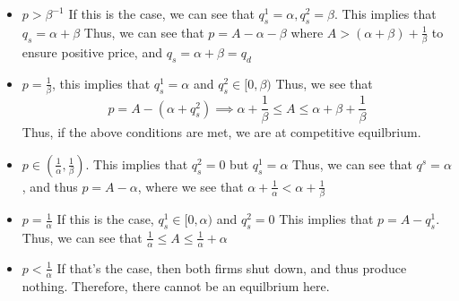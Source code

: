 \documentclass[11pt]{article}
\begin{document}
\begin{itemize}
    \item $p > \beta^{-1}$ If this is the case, we can see that $q^1_s = \alpha, q^2_s = \beta$. This implies that $q_s = \alpha + \beta$ Thus, we can see that $p = A - \alpha - \beta$ where $A > (\alpha + \beta) + \frac{1}{\beta}$ to ensure positive price, and $q_s = \alpha + \beta = q_d$
    \item $p = \frac{1}{\beta}$, this implies that $q^1_s = \alpha$ and $q^2_s \in [0, \beta)$ Thus, we see that \[
    p = A - (\alpha + q^2_s) \implies \alpha + \frac{1}{\beta} \leq A \leq \alpha + \beta + \frac{1}{\beta}
    \] Thus, if the above conditions are met, we are at competitive equilbrium.
    \item $p \in (\frac{1}{\alpha}, \frac{1}{\beta})$. This implies that $q^2_s = 0$ but $q^1_s = \alpha$ Thus, we can see that $q^s = \alpha$, and thus $p = A - \alpha$, where we see that $\alpha + \frac{1}{\alpha} < \alpha + \frac{1}{\beta}$
    \item $p = \frac{1}{\alpha}$ If this is the case, $q^1_s \in [0, \alpha)$ and $q^2_s = 0$ This implies that $p = A - q_s^1$. Thus, we can see that $\frac{1}{\alpha} \leq A \leq \frac{1}{\alpha} + \alpha$ 
    \item $p < \frac{1}{\alpha}$ If that's the case, then both firms shut down, and thus produce nothing. Therefore, there cannot be an equilbrium here. 
\end{itemize}
\end{document}
